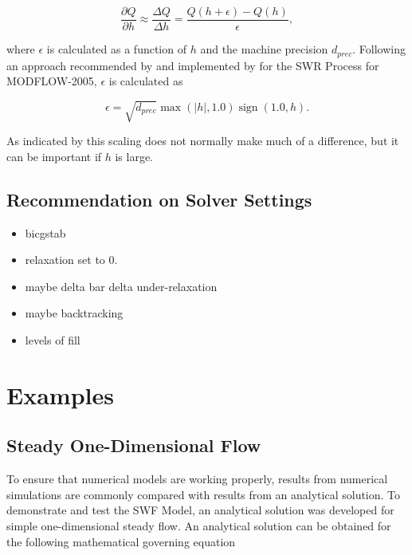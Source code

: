\documentclass[fleqn]{article}
\DeclareMathOperator{\sign}{sign}
\begin{document}
\begin{equation}
\label{eqn:derv}
\frac{\partial Q}{\partial h} \approx \frac{\Delta Q}{\Delta h} = \frac{Q \left ( h + \epsilon \right ) - Q \left ( h \right )}{\epsilon},
\end{equation}
  
\noindent where $\epsilon$ is calculated as a function of $h$ and the machine precision $d_{prec}$.  Following an approach recommended by \cite{kelley2003} and implemented by \cite{hughes2012documentation} for the SWR Process for MODFLOW-2005, $\epsilon$ is calculated as

\begin{equation}
\label{eqn:epsilon}
\epsilon = \sqrt{d_{prec}} \max(\left | h \right |, 1.0) \sign(1.0, h).
\end{equation}

\noindent As indicated by \cite{kelley2003} this scaling does not normally make much of a difference, but it can be important if $h$ is large.

\subsection{Recommendation on Solver Settings}

\begin{itemize}
  \item bicgstab
  \item relaxation set to 0.
  \item maybe delta bar delta under-relaxation
  \item maybe backtracking
  \item levels of fill
\end{itemize}


\newpage
\section{Examples}


\subsection{Steady One-Dimensional Flow}

To ensure that numerical models are working properly, results from numerical simulations are commonly compared with results from an analytical solution.  To demonstrate and test the SWF Model, an analytical solution was developed for simple one-dimensional steady flow.  An analytical solution can be obtained for the following mathematical governing equation
\end{document}
